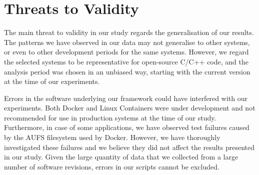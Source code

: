 \section{Threats to Validity}
\label{evolution:threats}

The main threat to validity in our study regards the generalisation of our
results.  The patterns we have observed in our data may not generalise to other
systems, or even to other development periods for the same systems.  However,
we regard the selected systems to be representative for open-source C/C++ code,
and the analysis period was chosen in an unbiased way, starting with the
current version at the time of our experiments.

Errors in the software underlying our framework could have interfered with our
experiments. Both Docker and Linux Containers were under development and not
recommended for use in production systems at the time of our study.
Furthermore, in case of some applications, we have observed test failures
caused by the AUFS filesystem used by Docker. However, we have thoroughly
investigated these failures and we believe they did not affect the results
presented in our study. Given the large quantity of data that we collected from
a large number of software revisions, errors in our scripts cannot be excluded.
